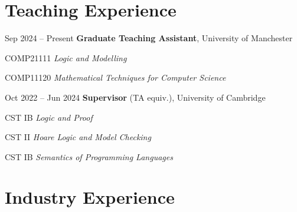 \documentclass[10pt, letterpaper]{article}
\begin{document}
    \section{Teaching Experience}

        \begin{twocolentry}{Sep 2024 -- Present}
            \textbf{Graduate Teaching Assistant}, University of Manchester
        \end{twocolentry}
        \vspace{0.10 cm}
        \begin{onecolentry}
            \begin{highlights}
                \item COMP21111 \textit{Logic and Modelling}
                \item COMP11120 \textit{Mathematical Techniques for Computer Science}
            \end{highlights}
        \end{onecolentry}

        \vspace{0.20 cm}

        \begin{twocolentry}{Oct 2022 -- Jun 2024}
            \textbf{Supervisor} (TA equiv.), University of Cambridge
        \end{twocolentry}
        \vspace{0.10 cm}
        \begin{onecolentry}
            \begin{highlights}
                \item CST IB \textit{Logic and Proof}
                \item CST II \textit{Hoare Logic and Model Checking}
                \item CST IB \textit{Semantics of Programming Languages}
            \end{highlights}
        \end{onecolentry}

    \section{Industry Experience}
\end{document}

